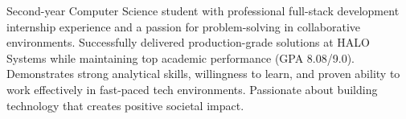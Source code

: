 \documentclass[11pt, a4paper]{awesome-cv}
\begin{document}
\makecvheader[C]

\begin{cventries}
Second-year Computer Science student with professional full-stack development internship experience and a passion for problem-solving in collaborative environments. Successfully delivered production-grade solutions at HALO Systems while maintaining top academic performance (GPA 8.08/9.0). Demonstrates strong analytical skills, willingness to learn, and proven ability to work effectively in fast-paced tech environments. Passionate about building technology that creates positive societal impact.
\end{cventries}
\end{document}
